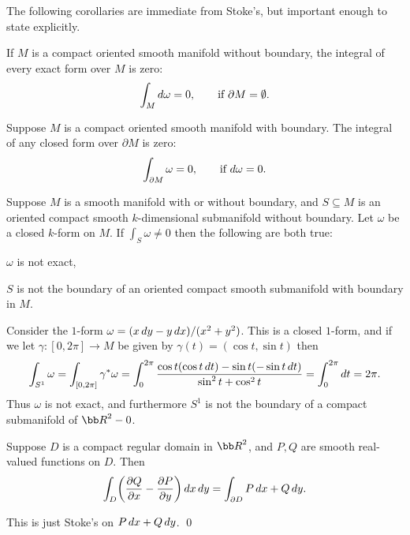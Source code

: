 \eexam

The following corollaries are immediate from Stoke's, but important enough to state explicitly.

\bcoro

    If $M$ is a compact oriented smooth manifold without boundary, the integral of every exact form over $M$ is zero:
    $$ \int_M\mathop{}\!d\omega = 0 ,\qquad \hbox{if $\partial M=\emptyset$} . $$

\ecoro

\bcoro

    Suppose $M$ is a compact oriented smooth manifold with boundary.
    The integral of any closed form over $\partial M$ is zero:
    $$ \int_{\partial M}\omega = 0,\qquad \hbox{if $\mathop{}\!d\omega=0$} . $$

\ecoro

\bcoro

    Suppose $M$ is a smooth manifold with or without boundary, and $S\subseteq M$ is an oriented compact smooth $k$-dimensional submanifold
    without boundary.
    Let $\omega$ be a closed $k$-form on $M$.
    If $\int_S\omega\neq0$ then the following are both true:
    \benum
        \item $\omega$ is not exact,
        \item $S$ is not the boundary of an oriented compact smooth submanifold with boundary in $M$.
    \eenum

\ecoro

\bexam

    Consider the $1$-form $\omega=(x\mathop{}\!d y-y\mathop{}\!d x)/(x^2+y^2)$.
    This is a closed $1$-form, and if we let $\gamma\colon[0,2\pi]\to M$ be given by $\gamma(t)=(\cos t,\sin t)$ then
    $$ \int_{S^1}\omega = \int_{[0,2\pi]}\gamma^*\omega = \int_0^{2\pi}{{\cos t(\cos t\mathop{}\!d t) - \sin t(-\sin t\mathop{}\!d t)}\over{\sin^2t+\cos^2t}} =
        \int_0^{2\pi}\mathop{}\!d t = 2\pi . $$
    Thus $\omega$ is not exact, and furthermore $S^1$ is not the boundary of a compact submanifold of $\bR^2-0$.

\eexam

\bthrm[title={Green's theorem}]

    Suppose $D$ is a compact regular domain in $\bR^2$, and $P,Q$ are smooth real-valued functions on $D$.
    Then
    $$ \int_D\mathopen{}\mathclose{\left({{\partial Q}\over{\partial x}}-{{\partial P}\over{\partial y}}\right)}\mathop{}\!d x\mathop{}\!d y = \int_{\partial D}P\mathop{}\!d x + Q\mathop{}\!d y . $$

\ethrm

\bproof

    This is just Stoke's on $P\mathop{}\!d x+Q\mathop{}\!d y$.
    \qed

\eproof

